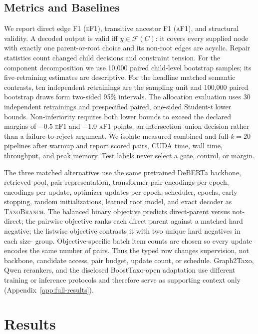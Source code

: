 \documentclass[11pt]{article}
\newcommand{\method}{\textsc{TaxoBranch}}
\newcommand{\ef}{\textsc{eF1}}
\newcommand{\af}{\textsc{aF1}}
\begin{document}
\subsection{Metrics and Baselines}

We report direct edge F1 (\ef), transitive ancestor F1 (\af), and structural
validity. A decoded output is valid iff $y\in\mathcal F(C)$: it covers every
supplied node with exactly one parent-or-root choice and its non-root edges are
acyclic. Repair statistics count changed child decisions and constraint
tension. For the component
decomposition we use 10,000 paired child-level bootstrap samples; its
five-retraining estimates are descriptive. For the headline matched semantic
contrasts, ten independent retrainings are the sampling unit and 100,000 paired
bootstrap draws form two-sided 95\% intervals. The allocation evaluation uses
30 independent retrainings and prespecified paired,
one-sided Student-$t$ lower bounds. Non-inferiority requires both lower bounds
to exceed the declared margins of $-0.5$ \ef{} and $-1.0$ \af{} points, an
intersection--union decision rather than a failure-to-reject argument.
We isolate measured combined and full-$k=20$ pipelines after warmup and report
scored pairs, CUDA time, wall time, throughput, and peak memory. Test labels
never select a gate, control, or margin.

The three matched alternatives use the same pretrained DeBERTa backbone,
retrieved pool, pair representation, \MatchedObjectivePairEncodings{} transformer pair
encodings per epoch, \MatchedObjectivePairsPerUpdate{} encodings per update,
\MatchedObjectiveUpdates{} optimizer updates per epoch, scheduler, epochs, early stopping,
random initializations, learned root model, and exact decoder as \method{}.
The balanced binary objective predicts direct-parent versus not-direct; the
pairwise objective ranks each direct parent against a matched hard negative;
the listwise objective contrasts it with two unique hard negatives in each
size-\RobustListwiseGroupSize{} group. Objective-specific batch item counts
are chosen so every update encodes the same number of pairs. Thus the typed row
changes supervision, not backbone, candidate access, pair budget, update count,
or schedule. Graph2Taxo, Qwen rerankers, and the disclosed BoostTaxo-open
adaptation use different training or inference protocols and therefore serve
as supporting context only (Appendix~\ref{app:full-results}).

\section{Results}
\end{document}
